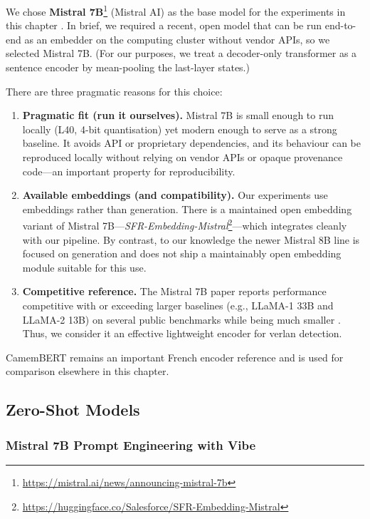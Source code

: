 \documentclass[12pt]{article}
\begin{document}
We chose \textbf{Mistral 7B}\footnote{\url{https://mistral.ai/news/announcing-mistral-7b}} (Mistral AI) as the base model for the experiments in this chapter \cite{jiang2023mistral7b}. In brief, we required a recent, open model that can be run end-to-end as an embedder on the computing cluster without vendor APIs, so we selected Mistral 7B. (For our purposes, we treat a decoder-only transformer as a sentence encoder by mean-pooling the last-layer states.)

There are three pragmatic reasons for this choice:
\begin{enumerate}
\item \textbf{Pragmatic fit (run it ourselves).} Mistral 7B is small enough to run locally (L40, 4-bit quantisation) yet modern enough to serve as a strong baseline. It avoids API or proprietary dependencies, and its behaviour can be reproduced locally without relying on vendor APIs or opaque provenance code\;---\;an important property for reproducibility.
\item \textbf{Available embeddings (and compatibility).} Our experiments use embeddings rather than generation. There is a maintained open embedding variant of Mistral 7B\;---\;\emph{SFR-Embedding-Mistral}\footnote{\url{https://huggingface.co/Salesforce/SFR-Embedding-Mistral}}\;---\;which integrates cleanly with our pipeline. By contrast, to our knowledge the newer Mistral 8B line is focused on generation and does not ship a maintainably open embedding module suitable for this use.
\item \textbf{Competitive reference.} The Mistral 7B paper reports performance competitive with or exceeding larger baselines (e.g., LLaMA-1 33B and LLaMA-2 13B) on several public benchmarks while being much smaller \cite{jiang2023mistral7b,touvron2023llama,touvron2023llama2}. Thus, we consider it an effective lightweight encoder for verlan detection.
\end{enumerate}

CamemBERT \cite{martin2019camembert} remains an important French encoder reference and is used for comparison elsewhere in this chapter.


\subsection{Zero-Shot Models}
\subsubsection{Mistral 7B Prompt Engineering with Vibe}
\end{document}
